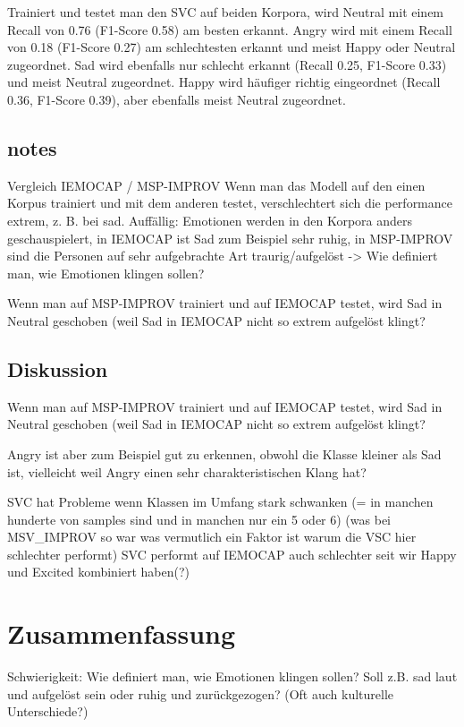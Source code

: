 \documentclass{article} %
\begin{document}
Trainiert und testet man den SVC auf beiden Korpora, wird Neutral mit einem Recall von 0.76 (F1-Score 0.58) am besten erkannt. Angry wird mit einem Recall von 0.18 (F1-Score 0.27) am schlechtesten erkannt und meist Happy oder Neutral zugeordnet. Sad wird ebenfalls nur schlecht erkannt (Recall 0.25, F1-Score 0.33) und meist Neutral zugeordnet. Happy wird häufiger richtig eingeordnet (Recall 0.36, F1-Score 0.39), aber ebenfalls meist Neutral zugeordnet. 

\subsection{notes}

Vergleich IEMOCAP / MSP-IMPROV
Wenn man das Modell auf den einen Korpus trainiert und mit dem anderen testet, verschlechtert sich die performance extrem, z. B. bei sad. Auffällig: Emotionen werden in den Korpora anders geschauspielert, in IEMOCAP ist Sad zum Beispiel sehr ruhig, in MSP-IMPROV sind die Personen auf sehr aufgebrachte Art traurig/aufgelöst
-> Wie definiert man, wie Emotionen klingen sollen?

Wenn man auf MSP-IMPROV trainiert und auf IEMOCAP testet, wird Sad in Neutral geschoben (weil Sad in IEMOCAP nicht so extrem aufgelöst klingt?

\subsection{Diskussion}

Wenn man auf MSP-IMPROV trainiert und auf IEMOCAP testet, wird Sad in Neutral geschoben (weil Sad in IEMOCAP nicht so extrem aufgelöst klingt?

Angry ist aber zum Beispiel gut zu erkennen, obwohl die Klasse kleiner als Sad ist, vielleicht weil Angry einen sehr charakteristischen Klang hat?

SVC hat Probleme wenn Klassen im Umfang stark schwanken (= in manchen hunderte von samples sind und in manchen nur ein 5 oder 6) (was bei MSV_IMPROV so war was vermutlich ein Faktor ist warum die VSC hier schlechter performt)
SVC performt auf IEMOCAP auch schlechter seit wir Happy und Excited kombiniert haben(?)

\section{Zusammenfassung}

Schwierigkeit: Wie definiert man, wie Emotionen klingen sollen? Soll z.B. sad laut und aufgelöst sein oder ruhig und zurückgezogen? (Oft auch kulturelle Unterschiede?)
\end{document}
